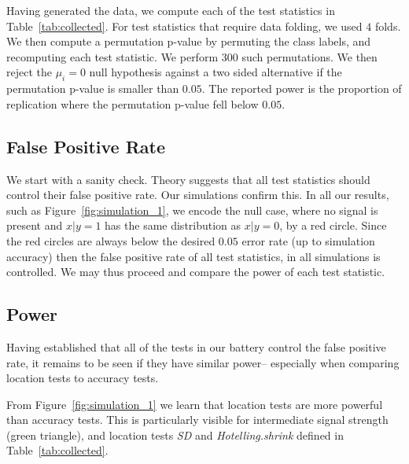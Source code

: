 \documentclass[12pt,a4paper]{article}
\begin{document}
Having generated the data, we compute each of the test statistics in Table~\ref{tab:collected}.
For test statistics that require data folding, we used $4$ folds. 
We then compute a permutation p-value by permuting the class labels, and recomputing each test statistic. 
We perform $300$ such permutations. 
We then reject the $\mu_i=0$ null hypothesis against a two sided alternative if the permutation p-value is smaller than $0.05$.
The reported power is the proportion of replication where the permutation p-value fell below $0.05$.



\subsection{False Positive Rate}
\label{sec:type_i}

We start with a sanity check. 
Theory suggests that all test statistics should control their false positive rate. 
Our simulations confirm this.
In all our results, such as Figure~\ref{fig:simulation_1}, we encode the null case, where no signal is present and $x|y=1$ has the same distribution as $x|y=0$, by a red circle. 
Since the red circles are always below the desired $0.05$ error rate (up to simulation accuracy) then the false positive rate of all test statistics, in all simulations is controlled. 
We may thus proceed and compare the power of each test statistic. 






\subsection{Power}
\label{sec:power}

Having established that all of the tests in our battery control the false positive rate, it remains to be seen if they have similar power-- especially when comparing location tests to accuracy tests. 

From Figure~\ref{fig:simulation_1} we learn that location tests are more powerful than accuracy tests.
This is particularly visible for intermediate signal strength (green triangle), and location tests \emph{SD} and \emph{Hotelling.shrink} defined in Table~\ref{tab:collected}.
\end{document}
